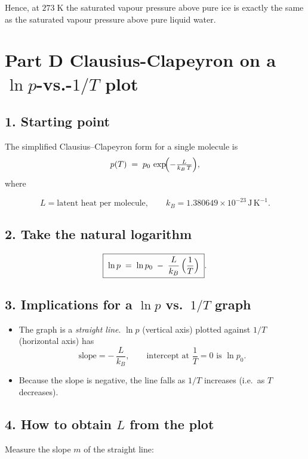 \documentclass[12pt]{article}
\theoremstyle{definition} %
\theoremstyle{plain} %
\begin{document}
\noindent
Hence, at \(273\;\text{K}\) the saturated vapour pressure above pure ice
is exactly the same as the saturated vapour pressure above pure liquid
water.
\section*{Part D Clausius-Clapeyron on a \(\ln p\)-vs.-\(1/T\) plot}

\subsection*{1.  Starting point}

The simplified Clausius–Clapeyron form for a single molecule is  
\[
  p(T)\;=\;p_{0}\,\exp\!\Bigl(-\tfrac{L}{k_B\,T}\Bigr),
\]
where  

\[
  L = \text{latent heat per molecule},   \qquad 
  k_B = 1.380649\times10^{-23}\,\mathrm{J\,K^{-1}} .
\]

\subsection*{2.  Take the natural logarithm}

\[
  \boxed{\;
    \ln p
    \;=\;
    \ln p_{0}
    \;-\;\frac{L}{k_B}\,\Bigl(\frac{1}{T}\Bigr)
  \;} .
\]

\subsection*{3.  Implications for a \(\ln p\) vs.\ \(1/T\) graph}

\begin{itemize}
  \item The graph is a \emph{straight line}.  
        \(\ln p\) (vertical axis) plotted against \(1/T\) (horizontal axis) has  
        \[
          \text{slope} = -\,\frac{L}{k_B}, 
          \qquad
          \text{intercept at } \frac{1}{T}=0 \text{ is } \ln p_0 .
        \]
  \item Because the slope is negative, the line falls as \(1/T\) increases  
        (i.e.\ as \(T\) decreases).
\end{itemize}

\subsection*{4.  How to obtain \(L\) from the plot}

Measure the slope \(m\) of the straight line:
\end{document}
